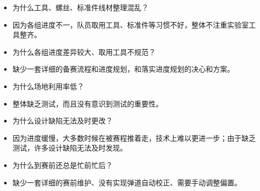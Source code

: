\begin{itemize}
            \item 为什么工具、螺丝、标准件线材整理混乱？
            \item 因为各组进度不一，队员取用工具、标准件等习惯不好，整体不注重实验室工具整齐。
            \item 为什么各组进度差异较大、取用工具不规范？
            \item 缺少一套详细的备赛流程和进度规划，和落实进度规划的决心和方案。\\

            \item 为什么场地利用率低？
            \item 整体缺乏测试，而且没有意识到测试的重要性。\\

            \item 为什么设计缺陷无法及时更改？
            \item 因为进度缓慢，大多数时候在被赛程推着走，技术上难以更进一步；由于缺乏测试，许多设计缺陷无法及时发现。\\

            \item 为什么到赛前还总是忙前忙后？
            \item 缺少一套详细的赛前维护、没有实现弹道自动校正、需要手动调整偏置。\\
        \end{itemize}